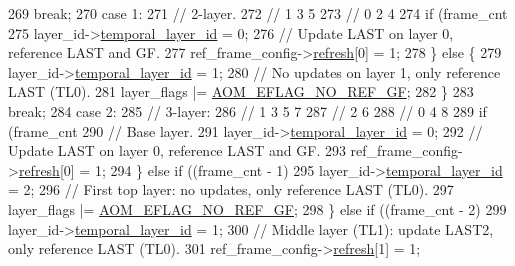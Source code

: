 \begin{DoxyCodeInclude}
{{{{{{{{{269       \textcolor{keywordflow}{break};
270     \textcolor{keywordflow}{case} 1:
271       \textcolor{comment}{// 2-layer.}
272       \textcolor{comment}{//    1    3    5}
273       \textcolor{comment}{//  0    2    4}
274       \textcolor{keywordflow}{if} (frame\_cnt %
275         layer\_id->\hyperlink{structaom__svc__layer__id_a9a28c1b126e8d1fdda6e1d881afb66fb}{temporal\_layer\_id} = 0;
276         \textcolor{comment}{// Update LAST on layer 0, reference LAST and GF.}
277         ref\_frame\_config->\hyperlink{structaom__svc__ref__frame__config_ab2a4596eadeaf5b7730588367918beda}{refresh}[0] = 1;
278       \} \textcolor{keywordflow}{else} \{
279         layer\_id->\hyperlink{structaom__svc__layer__id_a9a28c1b126e8d1fdda6e1d881afb66fb}{temporal\_layer\_id} = 1;
280         \textcolor{comment}{// No updates on layer 1, only reference LAST (TL0).}
281         layer\_flags |= \hyperlink{group__aom__encoder_gaaef6fe76991abf87edd2f296eee999f8}{AOM\_EFLAG\_NO\_REF\_GF};
282       \}
283       \textcolor{keywordflow}{break};
284     \textcolor{keywordflow}{case} 2:
285       \textcolor{comment}{// 3-layer:}
286       \textcolor{comment}{//   1    3   5    7}
287       \textcolor{comment}{//     2        6}
288       \textcolor{comment}{// 0        4        8}
289       \textcolor{keywordflow}{if} (frame\_cnt %
290         \textcolor{comment}{// Base layer.}
291         layer\_id->\hyperlink{structaom__svc__layer__id_a9a28c1b126e8d1fdda6e1d881afb66fb}{temporal\_layer\_id} = 0;
292         \textcolor{comment}{// Update LAST on layer 0, reference LAST and GF.}
293         ref\_frame\_config->\hyperlink{structaom__svc__ref__frame__config_ab2a4596eadeaf5b7730588367918beda}{refresh}[0] = 1;
294       \} \textcolor{keywordflow}{else} \textcolor{keywordflow}{if} ((frame\_cnt - 1) %
295         layer\_id->\hyperlink{structaom__svc__layer__id_a9a28c1b126e8d1fdda6e1d881afb66fb}{temporal\_layer\_id} = 2;
296         \textcolor{comment}{// First top layer: no updates, only reference LAST (TL0).}
297         layer\_flags |= \hyperlink{group__aom__encoder_gaaef6fe76991abf87edd2f296eee999f8}{AOM\_EFLAG\_NO\_REF\_GF};
298       \} \textcolor{keywordflow}{else} \textcolor{keywordflow}{if} ((frame\_cnt - 2) %
299         layer\_id->\hyperlink{structaom__svc__layer__id_a9a28c1b126e8d1fdda6e1d881afb66fb}{temporal\_layer\_id} = 1;
300         \textcolor{comment}{// Middle layer (TL1): update LAST2, only reference LAST (TL0).}
301         ref\_frame\_config->\hyperlink{structaom__svc__ref__frame__config_ab2a4596eadeaf5b7730588367918beda}{refresh}[1] = 1;
}}}}}}}}}
\end{DoxyCodeInclude}
